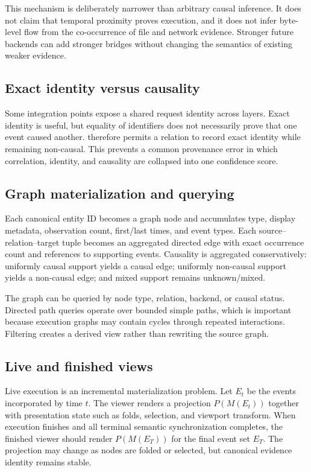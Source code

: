 This mechanism is deliberately narrower than arbitrary causal inference. It does not claim that temporal proximity proves execution, and it does not infer byte-level flow from the co-occurrence of file and network evidence. Stronger future backends can add stronger bridges without changing the semantics of existing weaker evidence.

\subsection{Exact identity versus causality}
Some integration points expose a shared request identity across layers. Exact identity is useful, but equality of identifiers does not necessarily prove that one event caused another. \system therefore permits a relation to record exact identity while remaining non-causal. This prevents a common provenance error in which correlation, identity, and causality are collapsed into one confidence score.

\subsection{Graph materialization and querying}
Each canonical entity ID becomes a graph node and accumulates type, display metadata, observation count, first/last times, and event types. Each source--relation--target tuple becomes an aggregated directed edge with exact occurrence count and references to supporting events. Causality is aggregated conservatively: uniformly causal support yields a causal edge; uniformly non-causal support yields a non-causal edge; and mixed support remains unknown/mixed.

The graph can be queried by node type, relation, backend, or causal status. Directed path queries operate over bounded simple paths, which is important because execution graphs may contain cycles through repeated interactions. Filtering creates a derived view rather than rewriting the source graph.

\subsection{Live and finished views}
Live execution is an incremental materialization problem. Let $E_t$ be the events incorporated by time $t$. The viewer renders a projection $P(M(E_t))$ together with presentation state such as folds, selection, and viewport transform. When execution finishes and all terminal semantic synchronization completes, the finished viewer should render $P(M(E_T))$ for the final event set $E_T$. The projection may change as nodes are folded or selected, but canonical evidence identity remains stable.

